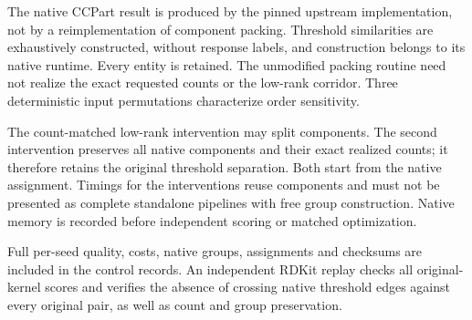 The native CCPart result is produced by the pinned upstream implementation,
not by a reimplementation of component packing. Threshold similarities are
exhaustively constructed, without response labels, and construction belongs
to its native runtime. Every entity is retained. The unmodified packing
routine need not realize the exact requested counts or the low-rank corridor.
Three deterministic input permutations characterize order sensitivity.

The count-matched low-rank intervention may split components. The second
intervention preserves all native components and their exact realized counts;
it therefore retains the original threshold separation. Both start from the
native assignment. Timings for the interventions reuse components and must
not be presented as complete standalone pipelines with free group construction.
Native memory is recorded before independent scoring or matched optimization.




Full per-seed quality, costs, native groups, assignments and checksums are
included in the control records. An independent RDKit replay checks all
original-kernel scores and verifies the absence of crossing native threshold
edges against every original pair, as well as count and group preservation.
